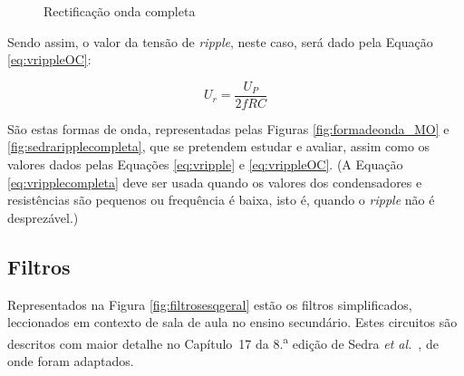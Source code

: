 \begin{figure}[hbtp]
	\centering%
		\centering
		\qquad
		\caption{Rectificação onda completa \cite{sedrasmith}}%
		\label{fig:rectificacaomeiaonda}%
\end{figure}

Sendo assim, o valor da tensão de \textit{ripple}, neste caso, será dado pela Equação \ref{eq:vrippleOC}:

\begin{equation} \label{eq:vrippleOC}
	U_{r} = \frac{U_{P}}{2fRC}
\end{equation}

São estas formas de onda, representadas pelas Figuras \ref{fig:formadeonda_MO} e \ref{fig:sedraripplecompleta}, que se pretendem estudar e avaliar, assim como os valores dados pelas Equações \ref{eq:vripple} e \ref{eq:vrippleOC}. (A Equação \ref{eq:vripplecompleta} deve ser usada quando os valores dos condensadores e resistências são pequenos ou frequência é baixa, isto é, quando o \textit{ripple} não é desprezável.)

\subsection{Filtros}
Representados na Figura \ref{fig:filtrosesqgeral} estão os filtros simplificados, leccionados em contexto de sala de aula no ensino secundário. Estes circuitos são descritos com maior detalhe no Capítulo~17 da 8.\textsuperscript{a} edição de Sedra \textit{et al.}~\cite{sedrasmith}, de onde foram adaptados.

